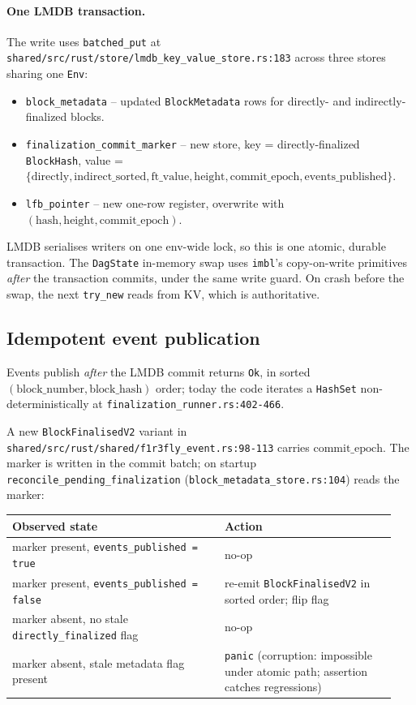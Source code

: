 \documentclass[11pt]{article}
\newcommand{\code}[1]{\texttt{#1}}
\begin{document}
\paragraph{One LMDB transaction.} The write uses
\code{batched\_put} at
\code{shared/src/rust/store/lmdb\_key\_value\_store.rs:183} across three
stores sharing one \code{Env}:
\begin{itemize}
\item \code{block\_metadata} -- updated \code{BlockMetadata} rows for
directly- and indirectly-finalized blocks.
\item \code{finalization\_commit\_marker} -- new store, key =
directly-finalized \code{BlockHash}, value = $\{\text{directly},
\text{indirect\_sorted}, \text{ft\_value}, \text{height},
\text{commit\_epoch}, \text{events\_published}\}$.
\item \code{lfb\_pointer} -- new one-row register, overwrite with
$(\text{hash}, \text{height}, \text{commit\_epoch})$.
\end{itemize}
LMDB serialises writers on one env-wide lock, so this is one atomic,
durable transaction. The \code{DagState} in-memory swap uses
\code{imbl}'s copy-on-write primitives \emph{after} the transaction
commits, under the same write guard. On crash before the swap, the next
\code{try\_new} reads from KV, which is authoritative.

\subsection{Idempotent event publication}
\label{sec:events}

Events publish \emph{after} the LMDB commit returns \code{Ok}, in
sorted $(\text{block\_number}, \text{block\_hash})$ order; today the
code iterates a \code{HashSet} non-deterministically at
\code{finalization\_runner.rs:402-466}.

A new \code{BlockFinalisedV2} variant in
\code{shared/src/rust/shared/f1r3fly\_event.rs:98-113} carries
$\text{commit\_epoch}$. The marker is written in the commit batch; on
startup \code{reconcile\_pending\_finalization}
(\code{block\_metadata\_store.rs:104}) reads the marker:

\begin{center}\small
\begin{tabular}{@{}p{0.52\linewidth}p{0.42\linewidth}@{}}
\toprule
\textbf{Observed state} & \textbf{Action} \\
\midrule
marker present, \code{events\_published = true} & no-op \\
marker present, \code{events\_published = false} & re-emit
\code{BlockFinalisedV2} in sorted order; flip flag \\
marker absent, no stale \code{directly\_finalized} flag & no-op \\
marker absent, stale metadata flag present & \code{panic} (corruption:
impossible under atomic path; assertion catches regressions) \\
\bottomrule
\end{tabular}
\end{center}
\end{document}
